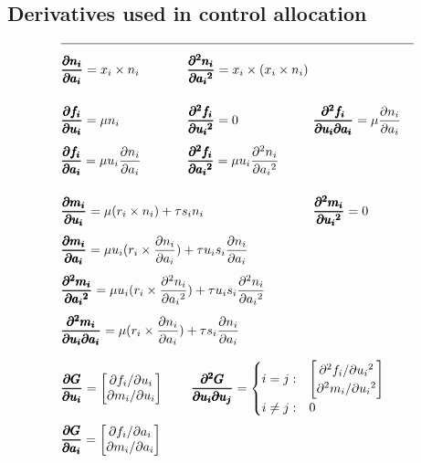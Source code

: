 \documentclass[conference]{IEEEtran}
\newcommand{\m}[1]{\begin{bmatrix}#1\end{bmatrix}}
\begin{document}
\subsection{Derivatives used in control allocation}
\label{sec:deriv_SQP}
\vspace{-14pt}
\allowdisplaybreaks
\begin{alignat*}{3}
	\hline & \mspace{160mu} && \mspace{160mu} \\[-8pt]
	&\pmb{\frac{\partial n_i}{\partial a_i}} = x_i \times n_i
	&&\mathrlap{\pmb{\frac{\partial^2 n_i}{\partial {a_i}^2}} = x_i \times (x_i \times n_i)} \\[12pt]
	&\pmb{\frac{\partial f_i}{\partial u_i}} = \mu n_i
	&&\pmb{\frac{\partial^2 f_i}{\partial {u_i}^2}} = 0
	&&\pmb{\frac{\partial^2 f_i}{\partial u_i \partial a_i}} = \mu \frac{\partial n_i}{\partial a_i} \\[4pt]
	&\pmb{\frac{\partial f_i}{\partial a_i}} = \mu u_i \frac{\partial n_i}{\partial a_i}
	&&\pmb{\frac{\partial^2 f_i}{\partial {a_i}^2}} = \mu u_i \frac{\partial^2 n_i}{\partial {a_i}^2} \\[12pt]
	&\mathrlap{\pmb{\frac{\partial m_i}{\partial u_i}} = \mu (r_i \times n_i) + \tau s_i n_i}
	&& &&\pmb{\frac{\partial^2 m_i}{\partial {u_i}^2}} = 0 \\[4pt]
	&\mathrlap{\pmb{\frac{\partial m_i}{\partial a_i}} = \mu u_i (r_i \times \frac{\partial n_i}{\partial a_i}) + \tau u_i s_i \frac{\partial n_i}{\partial a_i}} \\[4pt]
	&\mathrlap{\pmb{\frac{\partial^2 m_i}{\partial {a_i}^2}} = \mu u_i (r_i \times \frac{\partial^2 n_i}{\partial {a_i}^2}) + \tau u_i s_i \frac{\partial^2 n_i}{\partial {a_i}^2}} \\[4pt]
	&\mathrlap{\pmb{\frac{\partial^2 m_i}{\partial u_i \partial a_i}} = \mu (r_i \times \frac{\partial n_i}{\partial a_i}) + \tau s_i \frac{\partial n_i}{\partial a_i}} \\[8pt]
	&\pmb{\frac{\partial G}{\partial u_i}} = \m{\partial f_i / \partial u_i \\ \partial m_i / \partial u_i}
	&&\ \mathrlap{\pmb{\frac{\partial^2 G}{\partial u_i \partial u_j}} = \begin{cases} i=j: & \m{\partial^2 f_i / \partial {u_i}^2 \\ \partial^2 m_i / \partial {u_i}^2} \\ i\neq j: & 0 \end{cases}} \\[2pt]
	&\pmb{\frac{\partial G}{\partial a_i}} = \m{\partial f_i / \partial a_i \\ \partial m_i / \partial a_i}

\end{alignat*}
\end{document}
